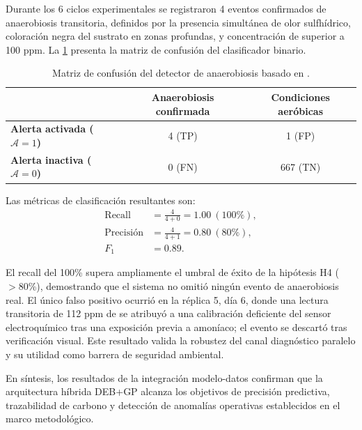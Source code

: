 Durante los \num{6} ciclos experimentales se registraron \num{4} eventos confirmados de anaerobiosis transitoria, definidos por la presencia simultánea de olor sulfhídrico, coloración negra del sustrato en zonas profundas, y concentración de  superior a \num{100} ppm. La \cref{tab:cap4_clasificacion_ch4} presenta la matriz de confusión del clasificador binario.

\begin{table}[htbp]
    \centering
    \caption{Matriz de confusión del detector de anaerobiosis basado en .}
    \label{tab:cap4_clasificacion_ch4}
    \begin{tabular}{@{}lcc@{}}
        \toprule
         & \textbf{Anaerobiosis confirmada} & \textbf{Condiciones aeróbicas} \\
        \midrule
        \textbf{Alerta activada ($\mathcal{A}=1$)} & \num{4} (TP) & \num{1} (FP) \\
        \textbf{Alerta inactiva ($\mathcal{A}=0$)} & \num{0} (FN) & \num{667} (TN) \\
        \bottomrule
    \end{tabular}
\end{table}

Las métricas de clasificación resultantes son:
\begin{align}
    \mathrm{Recall} &= \frac{\num{4}}{\num{4} + \num{0}} = \num{1.00}\ (\num{100}\%), \\
    \mathrm{Precisión} &= \frac{\num{4}}{\num{4} + \num{1}} = \num{0.80}\ (\num{80}\%), \\
    F_1 &= \num{0.89}.
\end{align}

El recall del \num{100}\% supera ampliamente el umbral de éxito de la hipótesis H4 ($> \num{80}$\%), demostrando que el sistema no omitió ningún evento de anaerobiosis real. El único falso positivo ocurrió en la réplica \num{5}, día \num{6}, donde una lectura transitoria de \num{112} ppm de  se atribuyó a una calibración deficiente del sensor electroquímico tras una exposición previa a amoníaco; el evento se descartó tras verificación visual. Este resultado valida la robustez del canal diagnóstico paralelo y su utilidad como barrera de seguridad ambiental.

En síntesis, los resultados de la integración modelo-datos confirman que la arquitectura híbrida DEB+GP alcanza los objetivos de precisión predictiva, trazabilidad de carbono y detección de anomalías operativas establecidos en el marco metodológico.
